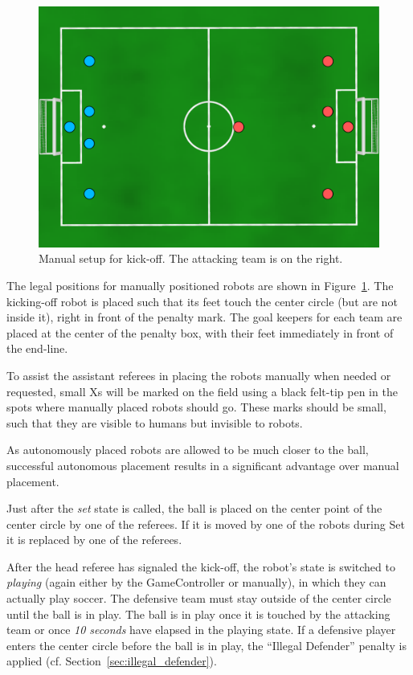 \documentclass[12pt]{article}
\newcommand{\cf}{\mbox{cf.}\xspace}
\begin{document}
\begin{figure}[t]
\centerline{\includegraphics[width=\columnwidth]{figs/manual-placement-2015.pdf}}
\caption{Manual setup for kick-off.  The attacking team is on the right.}
\label{fig:ko}
\end{figure}

The legal positions for manually positioned robots are shown in Figure~\ref{fig:ko}. The kicking-off robot is placed such that its feet touch the center circle (but are not inside it), right in front of the penalty mark. The goal keepers for each team are placed at the center of the penalty box, with their feet immediately in front of the end-line.

To assist the assistant referees in placing the robots manually when needed or requested, small Xs will be marked on the field using a black felt-tip pen in the spots where manually placed robots should go.  These marks should be small, such that they are visible to humans but invisible to robots.

As autonomously placed robots are allowed to be much closer to the ball, successful autonomous placement results in a significant advantage over manual placement.

Just after the \emph{set} state is called, the ball is placed on the center point of the center circle by one of the referees. If it is moved by one of the robots during Set it is replaced by one of the referees.

After the head referee has signaled the kick-off, the robot's state is switched to \emph{playing} (again either by the GameController or manually), in which they can actually play soccer.
The defensive team must stay outside of the center circle until the ball is in play.  The ball is in play once it is touched by the attacking team or once \emph{10 seconds} have elapsed in the playing state. If a defensive player enters the center circle before the ball is in play, the ``Illegal Defender'' penalty is applied (\cf Section~\ref{sec:illegal_defender}).
\end{document}
